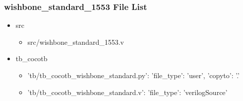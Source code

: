 \subsubsection{wishbone\_standard\_1553 File List}
\begin{itemize}
\item src
	\begin{itemize}
	\item src/wishbone\_standard\_1553.v
	\end{itemize}
\item tb\_cocotb
	\begin{itemize}
	\item {'tb/tb\_cocotb\_wishbone\_standard.py': {'file\_type': 'user', 'copyto': '.'}}
	\item {'tb/tb\_cocotb\_wishbone\_standard.v': {'file\_type': 'verilogSource'}}
	\end{itemize}
\end{itemize}
